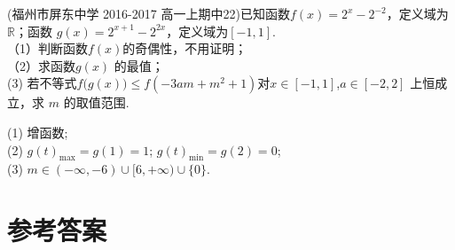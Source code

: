 \begin{exercise}
      (福州市屏东中学 2016-2017 高一上期中22)已知函数$f(x)=2^x-2^{-2} $，定义域为$\mathbb{R} $；函数 $g(x)=2^{x+1}-2^{2x} $，定义域为$[-1,1] $.\\
      （1）判断函数$f(x) $的奇偶性，不用证明；\\
      （2）求函数$g(x) $ 的最值；\\
       (3) 若不等式$f\bigl(g(x)\bigr)\leq f(-3am+m^2+1) $对$x\in[-1,1] $,$a\in[-2,2] $ 上恒成立，求 $m$ 的取值范围.
       \begin{answer}
       (1) 增函数; \\
       (2) $g(t)_{\max}=g(1)=1 $; $g(t)_{\min}=g(2)=0 $; \\
       (3) $m\in (-\infty,-6)\cup[6,+\infty)\cup\{0\} $.
      \end{answer}
      \vspace{20em}
  \end{exercise}
\stopexercise
\newpage
\section{参考答案}
\begin{multicols}{2}
  \printanswer
\end{multicols}
